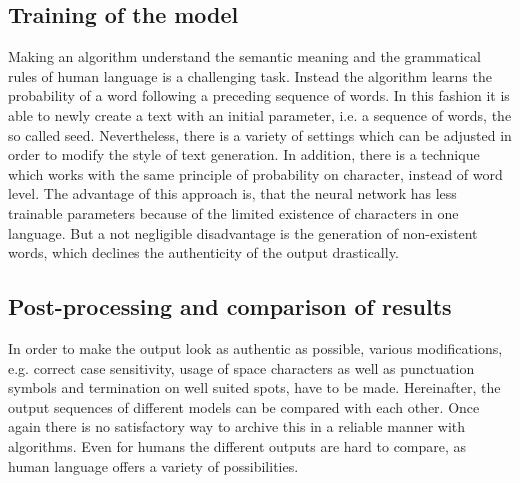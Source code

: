 \documentclass[a4paper,11pt,oneside]{article}
\begin{document}
  \subsection*{Training of the model}
  
  Making an algorithm understand the semantic meaning and the grammatical rules of human language is a challenging task. Instead the algorithm learns the probability of a word following a preceding sequence of words. In this fashion it is able to newly create a text with an initial parameter, i.e. a sequence of words, the so called seed. Nevertheless, there is a variety of settings which can be adjusted in order to modify the style of text generation. In addition, there is a technique which works with the same principle of probability on character, instead of word level. The advantage of this approach is, that the neural network has less trainable parameters because of the limited existence of characters in one language. But a not negligible disadvantage is the generation of non-existent words, which declines the authenticity of the output drastically.
  
  \subsection*{Post-processing and comparison of results}
  
  In order to make the output look as authentic as possible, various modifications, e.g. correct case sensitivity, usage of space characters as well as punctuation symbols and termination on well suited spots, have to be made. Hereinafter, the output sequences of different models can be compared with each other. Once again there is no satisfactory way to archive this in a reliable manner with algorithms. Even for humans the different outputs are hard to compare, as human language offers a variety of possibilities.
    
\end{document}
